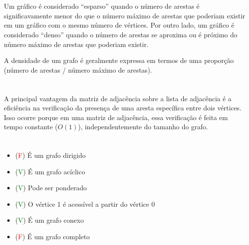 \documentclass{article}
\newcommand{\quotes}[1]{``#1''}
\begin{document}
\section{} %
    Um gráfico é considerado \quotes{esparso} quando o número de arestas é significavamente menor do que o número máximo de arestas que poderiam existir em um gráfico com o mesmo número de vértices. Por outro lado, um gráfico é considerado \quotes{denso} quando o número de arestas se aproxima ou é próximo do número máximo de arestas que poderiam existir. 
    
    A densidade de um grafo é geralmente expressa em termos de uma proporção (número de arestas / número máximo de arestas).
\section{} %
     A principal vantagem da matriz de adjacência sobre a lista de adjacência é a eficiência na verificação da presença de uma aresta específica entre dois vértices. Isso ocorre porque em uma matriz de adjacência, essa verificação é feita em tempo constante ($O(1)$), independentemente do tamanho do grafo.
\section{} %
    \subsection{}
        \begin{itemize}
            \item[] (\textcolor{red}{F}) É um grafo dirigido
            \item[] (\textcolor{green}{V}) É um grafo acíclico
            \item[] (\textcolor{green}{V}) Pode ser ponderado
            \item[] (\textcolor{green}{V}) O vértice 1 é acessível a partir do vértice 0
            \item[] (\textcolor{green}{V}) É um grafo conexo
            \item[] (\textcolor{red}{F}) É um grafo completo
        \end{itemize}
\end{document}
